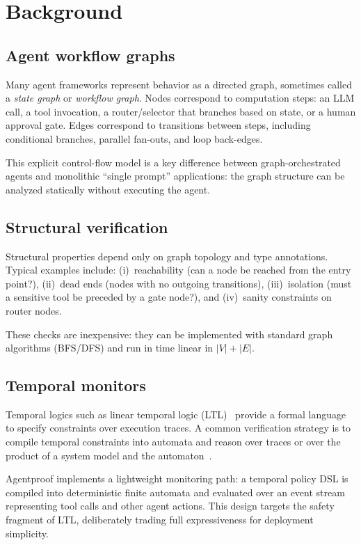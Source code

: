 \section{Background}
\label{sec:background}

\subsection{Agent workflow graphs}
Many agent frameworks represent behavior as a directed graph, sometimes
called a \emph{state graph} or \emph{workflow graph}. Nodes correspond
to computation steps: an LLM call, a tool invocation, a
router/selector that branches based on state, or a human approval gate.
Edges correspond to transitions between steps, including conditional
branches, parallel fan-outs, and loop back-edges.

This explicit control-flow model is a key difference between
graph-orchestrated agents and monolithic ``single prompt''
applications: the graph structure can be analyzed statically without
executing the agent.

\subsection{Structural verification}
Structural properties depend only on graph topology and type
annotations. Typical examples include:
(i)~reachability (can a node be reached from the entry point?),
(ii)~dead ends (nodes with no outgoing transitions),
(iii)~isolation (must a sensitive tool be preceded by a gate node?),
and (iv)~sanity constraints on router nodes.

These checks are inexpensive: they can be implemented with standard
graph algorithms (BFS/DFS) and run in time linear in $|V| + |E|$.

\subsection{Temporal monitors}
Temporal logics such as linear temporal logic
(LTL)~\citep{pnueli1977temporal} provide a formal language to specify
constraints over execution traces. A common verification strategy is to
compile temporal constraints into automata and reason over traces or
over the product of a system model and the
automaton~\citep{vardi1994automata}.

Agentproof implements a lightweight monitoring path: a temporal policy DSL is
compiled into deterministic finite automata and evaluated over an event
stream representing tool calls and other agent actions. This design
targets the safety fragment of LTL, deliberately trading full
expressiveness for deployment simplicity.

